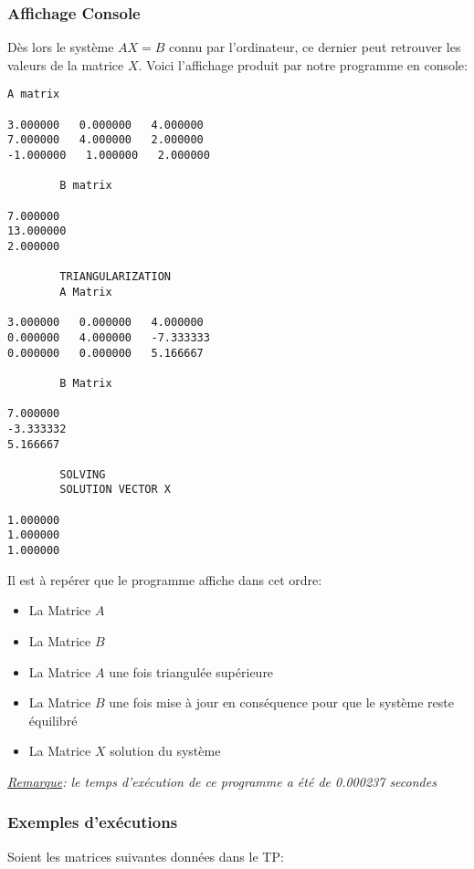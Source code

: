 \documentclass{report}
\begin{document}
\subsubsection{Affichage Console}
Dès lors le système $AX=B$ connu par l'ordinateur, ce dernier peut retrouver les valeurs de la matrice $X$. Voici l'affichage produit par notre programme en console: \\
\begin{lstlisting}[caption=Console Display of the Gauss elimination for the AX=B system mentioned above, basicstyle=\fontsize{6}{8}\selectfont]
		A matrix 

3.000000   0.000000   4.000000   
7.000000   4.000000   2.000000   
-1.000000   1.000000   2.000000   

		B matrix 

7.000000   
13.000000   
2.000000   

		TRIANGULARIZATION 
		A Matrix 

3.000000   0.000000   4.000000   
0.000000   4.000000   -7.333333   
0.000000   0.000000   5.166667   

		B Matrix 

7.000000   
-3.333332   
5.166667   

		SOLVING 
		SOLUTION VECTOR X 

1.000000   
1.000000   
1.000000   

\end{lstlisting}
Il est à repérer que le programme affiche dans cet ordre: \\
\begin{itemize}
\item La Matrice $A$ 
\item La Matrice $B$
\item La Matrice $A$ une fois triangulée supérieure
\item La Matrice $B$ une fois mise à jour en conséquence pour que le système reste équilibré
\item La Matrice $X$ solution du système
\end{itemize}

\textit{\underline{Remarque}: le temps d'exécution de ce programme a été de 0.000237 secondes}
\subsubsection{Exemples d'exécutions}

Soient les matrices suivantes données dans le TP:\\
\end{document}
